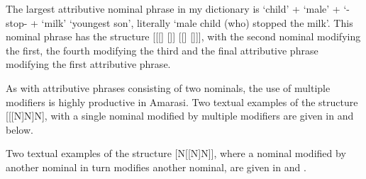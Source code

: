 The largest attributive nominal phrase in my dictionary is
 `child' +  `male' + \mbox{} `{\at}-stop-{\at}
+  `milk' {\ra}  `youngest son',
literally `male child (who) stopped the milk'.
This nominal phrase has the structure [[[] []] [[] []]],
with the second nominal modifying the first,
the fourth modifying the third and the final attributive
phrase modifying the first attributive phrase.

As with attributive phrases consisting of two nominals,
the use of multiple modifiers is highly productive in Amarasi.
Two textual examples of the structure [[[N]N]N],
with a single nominal modified by multiple modifiers
are given in  and  below.

\begin{exe}
	\label{ex:130907-3, 12.15}
	\label{ex:120715-2, 0.25}
\end{exe}

Two textual examples of the structure [N[[N]N]],
where a nominal modified by another nominal in turn modifies another nominal,
are given in  and .

